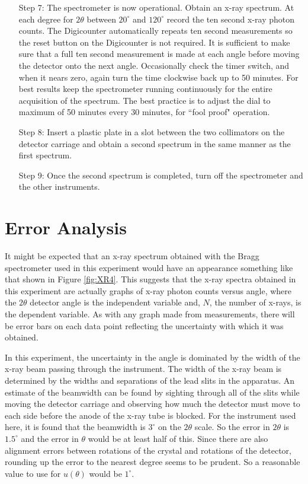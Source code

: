 \documentclass[12pt, a4paper, oneside, openright, titlepage]{book}
\begin{document}
\begin{itemize}[leftmargin = 50pt]
    \item[Step 7:] The spectrometer is now operational. Obtain an x-ray spectrum. At each degree for $2\theta$ between $20^{\circ}$ and $120^{\circ}$ record the ten second x-ray photon counts. The Digicounter automatically repeats ten second measurements so the reset button on the Digicounter is not required. It is sufficient to make sure that a full ten second measurement is made at each angle before moving the detector onto the next angle. Occasionally check the timer switch, and when it nears zero, again turn the time clockwise back up to 50 minutes. For best results keep the spectrometer running continuously for the entire acquisition of the spectrum. The best practice is to adjust the dial to maximum of 50 minutes every 30 minutes, for ``fool proof" operation.
    \item[Step 8:] Insert a plastic plate in a slot between the two collimators on the detector carriage and obtain a second spectrum in the same manner as the first spectrum.
    \item[Step 9:] Once the second spectrum is completed, turn off the spectrometer and the other instruments.
\end{itemize}


\section{Error Analysis}

It might be expected that an x-ray spectrum obtained with the Bragg spectrometer used in this experiment would have an appearance something like that shown in Figure \ref{fig:XR4}. This suggests that the x-ray spectra obtained in this experiment are actually graphs of x-ray photon counts versus angle, where the $2\theta$ detector angle is the independent variable and, $N$, the number of x-rays, is the dependent variable. As with any graph made from measurements, there will be error bars on each data point reflecting the uncertainty with which it was obtained.

\noindent In this experiment, the uncertainty in the angle is dominated by the width of the x-ray beam passing through the instrument. The width of the x-ray beam is determined by the widths and separations of the lead slits in the apparatus. An estimate of the beamwidth can be found by sighting through all of the slits while moving the detector carriage and observing how much the detector must move to each side before the anode of the x-ray tube is blocked. For the instrument used here, it is found that the beamwidth is $3^{\circ}$ on the $2\theta$ scale. So the error in $2\theta$ is $1.5^{\circ}$ and the error in $\theta$ would be at least half of this. Since there are also alignment errors between rotations of the crystal and rotations of the detector, rounding up the error to the nearest degree seems to be prudent. So a reasonable value to use for $u(\theta)$ would be $1^{\circ}.$
\end{document}

